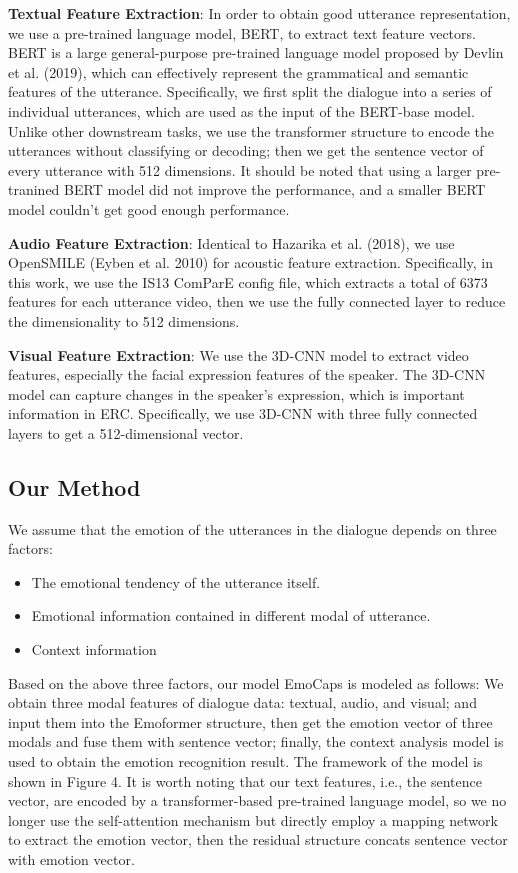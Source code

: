 \noindent\textbf{Textual Feature Extraction}: In order to obtain good utterance representation, we use a pre-trained language model, BERT, to extract text feature vectors. BERT is a large general-purpose pre-trained language model proposed by Devlin et al. (2019), which can effectively represent the grammatical and semantic features of the utterance. Specifically, we first split the dialogue into a series of individual utterances, which are used as the input of the BERT-base model. Unlike other downstream tasks, we use the transformer structure to encode the utterances without classifying or decoding; then we get the sentence vector of every utterance with 512 dimensions. It should be noted that using a larger pre-tranined BERT model did not improve the performance, and a smaller BERT model couldn't get good enough performance.

\noindent\textbf{Audio Feature Extraction}: Identical to Hazarika et al. (2018), we use OpenSMILE (Eyben et al. 2010) for acoustic feature extraction. Specifically, in this work, we use the IS13 ComParE config file, which extracts a total of 6373 features for each utterance video, then we use the fully connected layer to reduce the dimensionality to 512 dimensions.

\noindent\textbf{Visual Feature Extraction}: We use the 3D-CNN model to extract video features, especially the facial expression features of the speaker. The 3D-CNN model can capture changes in the speaker's expression, which is important information in ERC. Specifically, we use 3D-CNN with three fully connected layers to get a 512-dimensional vector.

\subsection{Our Method} 
We assume that the emotion of the utterances in the dialogue depends on three factors:
\begin{itemize}
	\item The emotional tendency of the utterance itself.
	\item Emotional information contained in different modal of utterance.
	\item Context information
\end{itemize}
Based on the above three factors, our model EmoCaps is modeled as follows: We obtain three modal features of dialogue data: textual, audio, and visual; and input them into the Emoformer structure, then get the emotion vector of three modals and fuse them with sentence vector; finally, the context analysis model is used to obtain the emotion recognition result. The framework of the model is shown in Figure 4. It is worth noting that our text features, i.e., the sentence vector, are encoded by a transformer-based pre-trained language model, so we no longer use the self-attention mechanism but directly employ a mapping network to extract the emotion vector, then the residual structure concats sentence vector with emotion vector.

